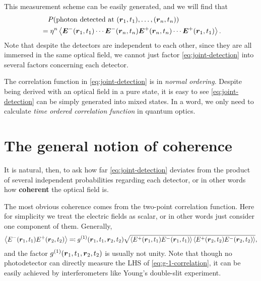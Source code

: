 \documentclass[hyperref, a4paper]{article}
\newcommand*{\concept}[1]{{\textbf{#1}}}
\begin{document}
This measurement scheme can be easily generated, and we will find that 
\begin{equation}
    \begin{aligned}
        &\quad P(\text{photon detected at ($\vb*{r}_1, t_1), \ldots, (\vb*{r}_n$}, t_n)) \\
        &= \eta^n \expval{\vb*{E}^-(\vb*{r}_1, t_1) \cdots \vb*{E}^-(\vb*{r}_n, t_n) \vb*{E}^+(\vb*{r}_n, t_n) \cdots \vb*{E}^+(\vb*{r}_1, t_1)}.
    \end{aligned}
    \label{eq:joint-detection}
\end{equation}
Note that despite the detectors are independent to each other, since they are all immersed in the same optical field, we cannot just factor \eqref{eq:joint-detection} into several factors concerning each detector.

The correlation function in \eqref{eq:joint-detection} is in \emph{normal ordering}.
Despite being derived with an optical field in a pure state, it is easy to see \eqref{eq:joint-detection} can be simply generated into mixed states.
In a word, we only need to calculate \emph{time ordered correlation function} in quantum optics.

\section{The general notion of coherence}

It is natural, then, to ask how far \eqref{eq:joint-detection} deviates from the product of several independent probabilities regarding each detector, or in other words how \concept{coherent} the optical field is.

The most obvious coherence comes from the two-point correlation function. 
Here for simplicity we treat the electric fields as scalar, or in other words just consider one component of them.
Generally, 
\begin{equation}
    \expval{{E}^-(\vb*{r}_1, t_1) {E}^+(\vb*{r}_2, t_2)} \eqqcolon g^{(1)}(\vb*{r}_1, t_1, \vb*{r}_2, t_2) \sqrt{\expval{{E}^+(\vb*{r}_1, t_1) {E}^-(\vb*{r}_1, t_1)} \expval{{E}^+(\vb*{r}_2, t_2) {E}^-(\vb*{r}_2, t_2)}} , 
    \label{eq:g-1-correlation}
\end{equation}
and the factor $g^{(1)}(\vb*{r}_1, t_1, \vb*{r}_2, t_2)$ is usually not unity.
Note that though no photodetector can directly measure the LHS of \eqref{eq:g-1-correlation}, it can be easily achieved by interferometers like Young's double-slit experiment.
\end{document}
